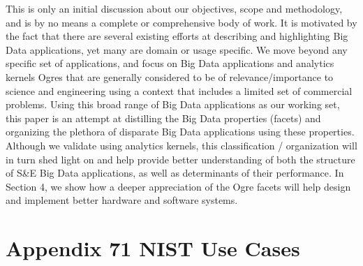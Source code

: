 \documentclass{acm_proc_article-sp}
\begin{document}
This is only an initial discussion about our objectives, scope and
methodology, and is by no means a complete or comprehensive body of
work. It is motivated by the fact that there are several existing
efforts at describing and highlighting Big Data applications, yet many
are domain or usage specific. We move beyond any specific set of
applications, and focus on Big Data applications and analytics kernels
Ogres that are generally considered to be of relevance/importance to
science and engineering using a context that includes a limited set of
commercial problems. Using this broad range of Big Data applications
as our working set, this paper is an attempt at distilling the Big
Data properties (facets) and organizing the plethora of disparate Big
Data applications using these properties. Although we validate using
analytics kernels, this classification / organization will in turn
shed light on and help provide better understanding of both the
structure of S\&E Big Data applications, as well as determinants of
their performance. In Section 4, we show how a deeper appreciation of
the Ogre facets will help design and implement better hardware and
software systems.








%

%
%
\appendix
\section{Appendix 71 NIST Use Cases}
\end{document}
